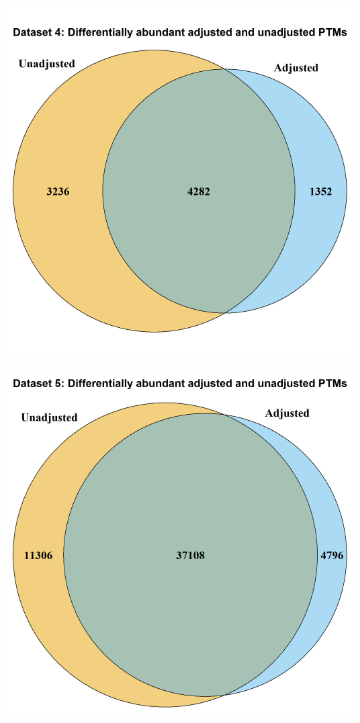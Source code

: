 \documentclass[mcp]{article}
\numberwithin{table}{section}
\begin{document}
\begin{figure}[ht]
\centering
\begin{subfigure}[c]{0.55\linewidth}
\includegraphics[width=1\textwidth]{images/ipah_venn_diagramm.png}
\caption{}
\label{fig:data4_venn_diagram}
\end{subfigure}
\begin{subfigure}[c]{0.55\linewidth}
\includegraphics[width=1\textwidth]{images/shig_venn_diagramm.png}

\end{subfigure}
\end{figure}
\end{document}
